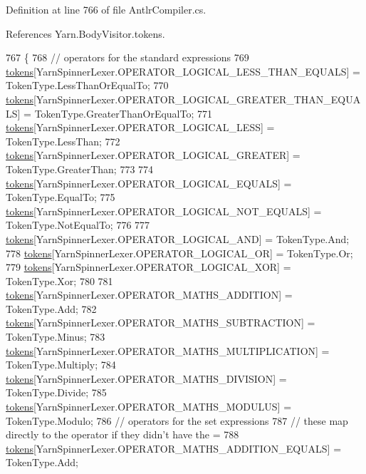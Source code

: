 Definition at line 766 of file Antlr\-Compiler.\-cs.



References Yarn.\-Body\-Visitor.\-tokens.


\begin{DoxyCode}
767         \{
768             \textcolor{comment}{// operators for the standard expressions}
769             \hyperlink{a00034_ab8aa4dbe47a807e3d973df2b85e3fffc}{tokens}[YarnSpinnerLexer.OPERATOR\_LOGICAL\_LESS\_THAN\_EQUALS] = TokenType.LessThanOrEqualTo;
770             \hyperlink{a00034_ab8aa4dbe47a807e3d973df2b85e3fffc}{tokens}[YarnSpinnerLexer.OPERATOR\_LOGICAL\_GREATER\_THAN\_EQUALS] = 
      TokenType.GreaterThanOrEqualTo;
771             \hyperlink{a00034_ab8aa4dbe47a807e3d973df2b85e3fffc}{tokens}[YarnSpinnerLexer.OPERATOR\_LOGICAL\_LESS] = TokenType.LessThan;
772             \hyperlink{a00034_ab8aa4dbe47a807e3d973df2b85e3fffc}{tokens}[YarnSpinnerLexer.OPERATOR\_LOGICAL\_GREATER] = TokenType.GreaterThan;
773 
774             \hyperlink{a00034_ab8aa4dbe47a807e3d973df2b85e3fffc}{tokens}[YarnSpinnerLexer.OPERATOR\_LOGICAL\_EQUALS] = TokenType.EqualTo;
775             \hyperlink{a00034_ab8aa4dbe47a807e3d973df2b85e3fffc}{tokens}[YarnSpinnerLexer.OPERATOR\_LOGICAL\_NOT\_EQUALS] = TokenType.NotEqualTo;
776 
777             \hyperlink{a00034_ab8aa4dbe47a807e3d973df2b85e3fffc}{tokens}[YarnSpinnerLexer.OPERATOR\_LOGICAL\_AND] = TokenType.And;
778             \hyperlink{a00034_ab8aa4dbe47a807e3d973df2b85e3fffc}{tokens}[YarnSpinnerLexer.OPERATOR\_LOGICAL\_OR] = TokenType.Or;
779             \hyperlink{a00034_ab8aa4dbe47a807e3d973df2b85e3fffc}{tokens}[YarnSpinnerLexer.OPERATOR\_LOGICAL\_XOR] = TokenType.Xor;
780 
781             \hyperlink{a00034_ab8aa4dbe47a807e3d973df2b85e3fffc}{tokens}[YarnSpinnerLexer.OPERATOR\_MATHS\_ADDITION] = TokenType.Add;
782             \hyperlink{a00034_ab8aa4dbe47a807e3d973df2b85e3fffc}{tokens}[YarnSpinnerLexer.OPERATOR\_MATHS\_SUBTRACTION] = TokenType.Minus;
783             \hyperlink{a00034_ab8aa4dbe47a807e3d973df2b85e3fffc}{tokens}[YarnSpinnerLexer.OPERATOR\_MATHS\_MULTIPLICATION] = TokenType.Multiply;
784             \hyperlink{a00034_ab8aa4dbe47a807e3d973df2b85e3fffc}{tokens}[YarnSpinnerLexer.OPERATOR\_MATHS\_DIVISION] = TokenType.Divide;
785             \hyperlink{a00034_ab8aa4dbe47a807e3d973df2b85e3fffc}{tokens}[YarnSpinnerLexer.OPERATOR\_MATHS\_MODULUS] = TokenType.Modulo;
786             \textcolor{comment}{// operators for the set expressions}
787             \textcolor{comment}{// these map directly to the operator if they didn't have the =}
788             \hyperlink{a00034_ab8aa4dbe47a807e3d973df2b85e3fffc}{tokens}[YarnSpinnerLexer.OPERATOR\_MATHS\_ADDITION\_EQUALS] = TokenType.Add;

\end{DoxyCode}
